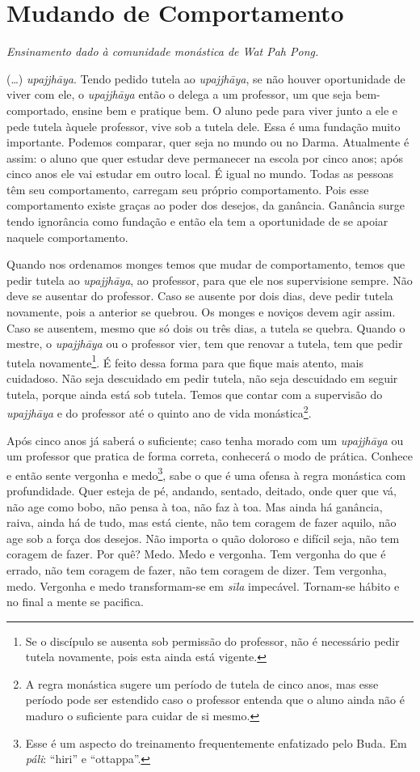 
\chapter{Mudando de Comportamento}

{\itshape
Ensinamento dado à comunidade monástica de Wat Pah Pong.}

(…) \textit{upajjhāya}. Tendo pedido tutela ao
\textit{upajjhāya}, se não houver oportunidade de viver com ele, o
\textit{upajjhāya} então o delega a um professor, um que seja
bem-comportado, ensine bem e pratique bem. O aluno pede para viver
junto a ele e pede tutela àquele professor, vive sob a tutela dele.
Essa é uma fundação muito importante. Podemos comparar, quer seja no
mundo ou no Darma. Atualmente é assim: o aluno que quer estudar deve
permanecer na escola por cinco anos; após cinco anos ele vai estudar em
outro local. É igual no mundo. Todas as pessoas têm seu comportamento,
carregam seu próprio comportamento. Pois esse comportamento existe
graças ao poder dos desejos, da ganância. Ganância surge tendo
ignorância como fundação e então ela tem a oportunidade de se apoiar
naquele comportamento. 

Quando nos ordenamos monges temos que mudar de comportamento, temos
que pedir tutela ao \textit{upajjhāya}, ao professor, para que ele
nos supervisione sempre. Não deve se ausentar do professor. Caso se
ausente por dois dias, deve pedir tutela novamente, pois a anterior se
quebrou. Os monges e noviços devem agir assim. Caso se ausentem, mesmo
que só dois ou três dias, a tutela se quebra. Quando o mestre, o
\textit{upajjhāya} ou o professor vier, tem que renovar a tutela, tem
que pedir tutela novamente\footnote{Se o discípulo se ausenta sob
permissão do professor, não é necessário pedir tutela novamente, pois
esta ainda está vigente.}. É feito dessa forma para que fique mais
atento, mais cuidadoso. Não seja descuidado em pedir tutela, não seja
descuidado em seguir tutela, porque ainda está sob tutela. Temos que
contar com a supervisão do \textit{upajjhāya} e do professor até o
quinto ano de vida monástica\footnote{A regra monástica sugere um
período de tutela de cinco anos, mas esse período pode ser estendido
caso o professor entenda que o aluno ainda não é maduro o suficiente
para cuidar de si mesmo.}. 

Após cinco anos já saberá o suficiente; caso tenha morado com um
\textit{upajjhāya} ou um professor que pratica de forma correta,
conhecerá o modo de prática. Conhece e então sente vergonha e
medo\footnote{Esse é um aspecto do treinamento frequentemente
enfatizado pelo Buda. Em \textit{páli}: “hiri” e “ottappa”.}, sabe o
que é uma ofensa à regra monástica com profundidade. Quer esteja de pé,
andando, sentado, deitado, onde quer que vá, não age como bobo, não
pensa à toa, não faz à toa. Mas ainda há ganância, raiva, ainda há de
tudo, mas está ciente, não tem coragem de fazer aquilo, não age sob a
força dos desejos. Não importa o quão doloroso e difícil seja, não tem
coragem de fazer. Por quê? Medo. Medo e vergonha. Tem vergonha do que é
errado, não tem coragem de fazer, não tem coragem de dizer. Tem
vergonha, medo. Vergonha e medo transformam-se em \textit{sīla}
impecável. Tornam-se hábito e no final a mente se pacifica. 

